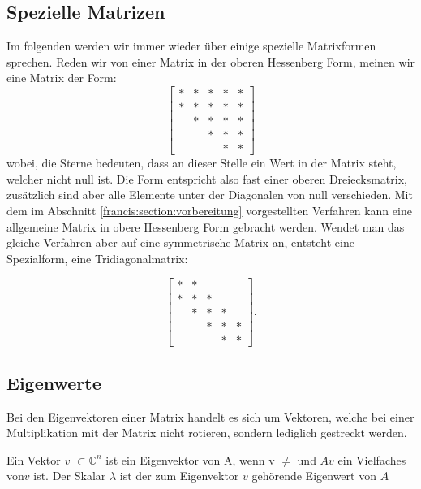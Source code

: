 \subsection{Spezielle Matrizen\label{francis:section:grundlagen:spezielle_matrizen}}
Im folgenden werden wir immer wieder über einige spezielle Matrixformen sprechen.
Reden wir von einer Matrix in der oberen Hessenberg Form, meinen wir eine Matrix der Form:
\begin{equation}
	\begin{bmatrix}
	* & * & * & * & * \\
	* & * & * & * & * \\
	& * & * & * & * \\
	&   & * & * & * \\
	&   &   & * & *
	\end{bmatrix}
\end{equation}
wobei, die Sterne bedeuten, dass an dieser Stelle ein Wert in der Matrix steht, welcher nicht null ist.
Die Form entspricht also fast einer oberen Dreiecksmatrix, zusätzlich sind aber alle Elemente unter der Diagonalen von null verschieden.
Mit dem im Abschnitt \ref{francis:section:vorbereitung} vorgestellten Verfahren kann eine allgemeine Matrix in obere Hessenberg Form gebracht werden. Wendet man das gleiche Verfahren aber auf eine symmetrische Matrix an, entsteht eine Spezialform, eine Tridiagonalmatrix:

\begin{equation}
	\begin{bmatrix}
	* & * &   &   &   \\
	* & * & *  &   &   \\
	& * & * & * &  \\
	&   & * & * & * \\
	&   &   & * & *
	\end{bmatrix}.
\end{equation}

\subsection{Eigenwerte\label{francis:section:grundlagen:eigenwerte}}
Bei den Eigenvektoren einer Matrix handelt es sich um Vektoren, welche bei einer Multiplikation mit der Matrix nicht rotieren, sondern lediglich gestreckt werden.

\begin{satz}
	Ein Vektor $v$ $\subset \mathbb{C}^n$ ist ein Eigenvektor von A, wenn v $\neq$ und $Av$ ein Vielfaches von$v$ ist. Der Skalar $\lambda$ ist der zum Eigenvektor $v$ gehörende Eigenwert von $A$
\end{satz}

